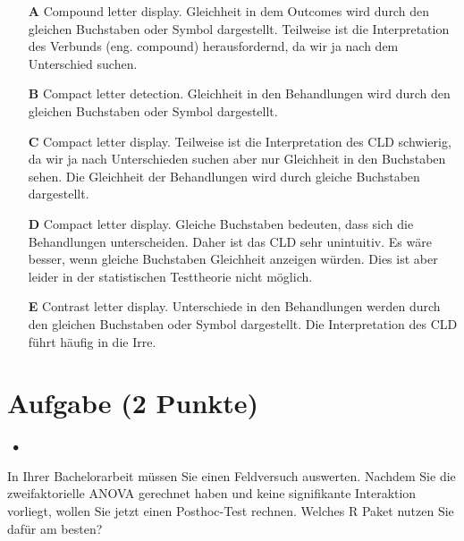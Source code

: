 \documentclass[a4paper, 9pt]{scrartcl}\usepackage[]{graphicx}\usepackage[]{xcolor}
\begin{document}
\begin{enumerate}
\item [\textbf{A} \msquare] Compound letter display. Gleichheit in dem Outcomes wird durch den gleichen Buchstaben oder Symbol dargestellt. Teilweise ist die Interpretation des Verbunds (eng. compound) herausfordernd, da wir ja nach dem Unterschied suchen.
\item [\textbf{B} \msquare] Compact letter detection. Gleichheit in den Behandlungen wird durch den gleichen Buchstaben oder Symbol dargestellt.
\item [\textbf{C} \msquare] Compact letter display. Teilweise ist die Interpretation des CLD schwierig, da wir ja nach Unterschieden suchen aber nur Gleichheit in den Buchstaben sehen. Die Gleichheit der Behandlungen wird durch gleiche Buchstaben dargestellt.
\item [\textbf{D} \msquare] Compact letter display. Gleiche Buchstaben bedeuten, dass sich die Behandlungen unterscheiden. Daher ist das CLD sehr unintuitiv. Es wäre besser, wenn gleiche Buchstaben Gleichheit anzeigen würden. Dies ist aber leider in der statistischen Testtheorie nicht möglich.
\item [\textbf{E} \msquare] Contrast letter display. Unterschiede in den Behandlungen werden durch den gleichen Buchstaben oder Symbol dargestellt. Die Interpretation des CLD führt häufig in die Irre.
\end{enumerate}

\section{Aufgabe \hfill (2 Punkte)}

\ifcollection
\begin{flushright}
\tiny\vspace{-2Ex}
\textbf{\examinhaltstart}
\exammodulestatversuch $\;\bullet$
\exammodulebiostat
\vspace{-1Ex}
\end{flushright}
\fi




In Ihrer Bachelorarbeit müssen Sie einen Feldversuch auswerten. Nachdem Sie die zweifaktorielle ANOVA gerechnet haben und keine signifikante Interaktion vorliegt, wollen Sie jetzt einen Posthoc-Test rechnen. Welches R Paket nutzen Sie dafür am besten?
\end{document}
